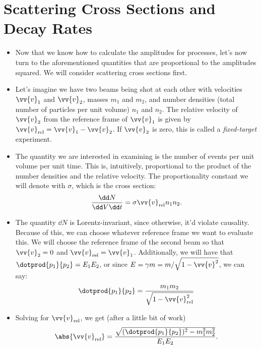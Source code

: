 \section{Scattering Cross Sections and Decay Rates}


\begin{itemize}
    \item Now that we know how to calculate the amplitudes for processes, let's now turn to the aforementioned quantities that are proportional to the amplitudes squared. We will consider scattering cross sections first.
    \item Let's imagine we have two beams being shot at each other with velocities $\vv{v}_1$ and $\vv{v}_2$, masses $m_1$ and $m_2$, and number densities (total number of particles per unit volume) $n_1$ and $n_2$. The relative velocity of $\vv{v}_2$ from the reference frame of $\vv{v}_1$ is given by $\vv{v}_{\mathrm{rel}} = \vv{v}_1 - \vv{v}_2$. If $\vv{v}_2$ is zero, this is called a \textit{fixed-target} experiment.
    \item The quantity we are interested in examining is the number of events per unit volume per unit time. This is, intuitively, proportional to the product of the number densities and the relative velocity. The proportionality constant we will denote with $\sigma$, which is the cross section:
        \begin{equation*}
            \frac{\dd N}{\dd V \dd t} = \sigma \vv{v}_{\mathrm{rel}} n_1n_2.
        \end{equation*}
    \item The quantity $\dd N$ is Lorentz-invariant, since otherwise, it'd violate causality. Because of this, we can choose whatever reference frame we want to evaluate this. We will choose the reference frame of the second beam so that $\vv{v}_2 = 0$ and $\vv{v}_{\mathrm{rel}} = \vv{v}_1$. Additionally, we will have that $\dotprod{p_1}{p_2} = E_1E_2$, or since $E = \gamma m = m/\sqrt{1-\vv{v}^2}$, we can say:
        \begin{equation*}
            \dotprod{p_1}{p_2} = \frac{m_1m_2}{\sqrt{1 - \vv{v}_{\mathrm{rel}}^2}}
        \end{equation*}
    \item Solving for $\vv{v}_{\mathrm{rel}}$, we get (after a little bit of work)
        \begin{equation*}
            \abs{\vv{v}_{\mathrm{rel}}} = \frac{\sqrt{(\dotprod{p_1}{p_2})^2 - m_1^2m_2^2}}{E_1E_2}.
        \end{equation*}

\end{itemize}
